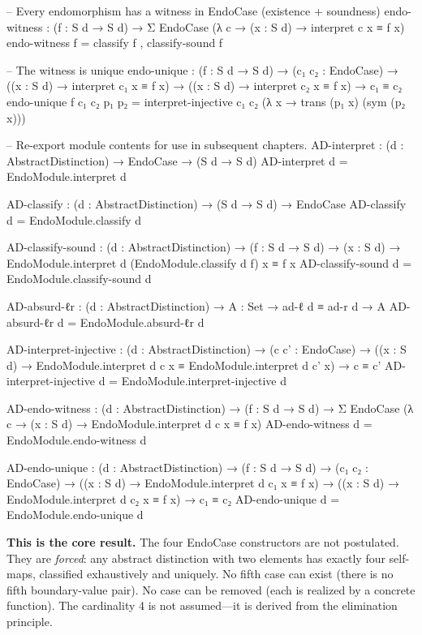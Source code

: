 \documentclass[11pt,a4paper]{book}
\begin{document}
\begin{code}
  -- Every endomorphism has a witness in EndoCase (existence + soundness)
  endo-witness : (f : S d → S d) →
                 Σ EndoCase (λ c → (x : S d) → interpret c x ≡ f x)
  endo-witness f = classify f , classify-sound f

  -- The witness is unique
  endo-unique : (f : S d → S d) →
                (c₁ c₂ : EndoCase) →
                ((x : S d) → interpret c₁ x ≡ f x) →
                ((x : S d) → interpret c₂ x ≡ f x) →
                c₁ ≡ c₂
  endo-unique f c₁ c₂ p₁ p₂ =
    interpret-injective c₁ c₂
      (λ x → trans (p₁ x) (sym (p₂ x)))

-- Re-export module contents for use in subsequent chapters.
AD-interpret : (d : AbstractDistinction) → EndoCase → (S d → S d)
AD-interpret d = EndoModule.interpret d

AD-classify : (d : AbstractDistinction) → (S d → S d) → EndoCase
AD-classify d = EndoModule.classify d

AD-classify-sound : (d : AbstractDistinction) → (f : S d → S d) →
                    (x : S d) → EndoModule.interpret d (EndoModule.classify d f) x ≡ f x
AD-classify-sound d = EndoModule.classify-sound d

AD-absurd-ℓr : (d : AbstractDistinction) → {A : Set} → ad-ℓ d ≡ ad-r d → A
AD-absurd-ℓr d = EndoModule.absurd-ℓr d

AD-interpret-injective : (d : AbstractDistinction) →
  (c c' : EndoCase) →
  ((x : S d) → EndoModule.interpret d c x ≡ EndoModule.interpret d c' x) →
  c ≡ c'
AD-interpret-injective d = EndoModule.interpret-injective d

AD-endo-witness : (d : AbstractDistinction) → (f : S d → S d) →
                  Σ EndoCase (λ c → (x : S d) → EndoModule.interpret d c x ≡ f x)
AD-endo-witness d = EndoModule.endo-witness d

AD-endo-unique : (d : AbstractDistinction) → (f : S d → S d) →
                 (c₁ c₂ : EndoCase) →
                 ((x : S d) → EndoModule.interpret d c₁ x ≡ f x) →
                 ((x : S d) → EndoModule.interpret d c₂ x ≡ f x) →
                 c₁ ≡ c₂
AD-endo-unique d = EndoModule.endo-unique d
\end{code}

\medskip
\noindent\textbf{This is the core result.} The four EndoCase constructors are not
postulated. They are \emph{forced}: any abstract distinction with two elements has
exactly four self-maps, classified exhaustively and uniquely. No fifth case can exist
(there is no fifth boundary-value pair). No case can be removed (each is realized by
a concrete function). The cardinality 4 is not assumed—it is derived from the
elimination principle.
\end{document}
